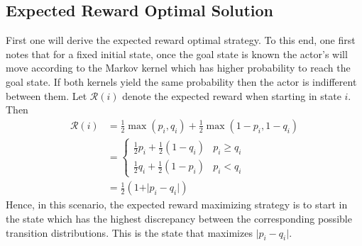 \documentclass{article}
\newcommand{\Rr}{\mathcal{R}}
\begin{document}
\subsection{Expected Reward Optimal Solution}
First one will derive the expected reward optimal strategy. To this end, one first notes that for a fixed initial state, once the goal state is known the actor's will move according to the Markov kernel which has higher probability to reach the goal state. If both kernels yield the same probability then the actor is indifferent between them. Let $\Rr(i)$ denote the expected reward when starting in state $i$. Then
\begin{align*}
\Rr(i) 
	&= \frac{1}{2} \max(p_i,q_i) +\frac{1}{2} \max(1-p_i,1-q_i)\\
	&=\begin{cases}
		\frac{1}{2} p_i +\frac{1}{2} (1-q_i) & p_i\geq q_i\\
		\frac{1}{2} q_i +\frac{1}{2} (1-p_i) & p_i < q_i
		\end{cases}\\
	&=\frac{1}{2}(1+\vert p_i - q_i \vert) 	
\end{align*}
Hence, in this scenario, the expected reward maximizing strategy is to start in the state which has the highest discrepancy between the corresponding possible transition distributions. This is the state that maximizes $\vert p_i-q_i\vert$.
\end{document}

